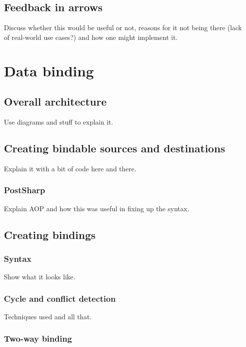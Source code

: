 \documentclass[12pt,twoside,notitlepage]{report}
\begin{document}
\subsection{Feedback in arrows}

Discuss whether this would be useful or not, reasons for it not being there (lack of real-world use cases?) and how one might implement it.


\section{Data binding}

\subsection{Overall architecture}

Use diagrams and stuff to explain it.

\subsection{Creating bindable sources and destinations}

Explain it with a bit of code here and there.

\subsubsection*{PostSharp}

Explain AOP and how this was useful in fixing up the syntax.

\subsection{Creating bindings}

\subsubsection{Syntax}

Show what it looks like.

\subsubsection{Cycle and conflict detection}

Techniques used and all that.

\subsubsection{Two-way binding}
\end{document}
